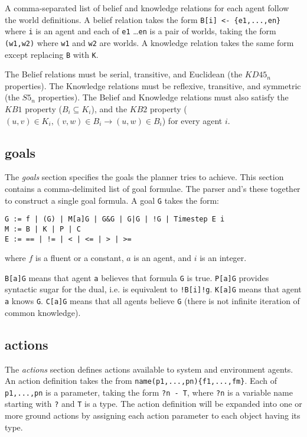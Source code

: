 \documentclass{article}
\newcommand{\kdff}{\ensuremath{KD45_n}}
\newcommand{\sfive}{\ensuremath{S5_n}}
\newcommand{\kbone}{\ensuremath{KB1}}
\newcommand{\kbtwo}{\ensuremath{KB2}}
\begin{document}
A comma-separated list of belief and knowledge relations for each agent follow the world definitions.
A belief relation takes the form
\verb|B[i] <- {e1,...,en}|
where \verb|i| is an agent
and each of \verb|e1| \ldots \verb|en| is a pair of worlds, taking the
form \verb|(w1,w2)| where \verb|w1| and \verb|w2| are worlds.
A knowledge relation takes the same form except replacing \verb|B| with \verb|K|.

The Belief relations must be serial, transitive, and Euclidean (the \kdff{}
properties). The Knowledge relations must be reflexive, transitive, and
symmetric (the \sfive{} properties). The Belief and Knowledge relations must also
satisfy the \kbone{} property ($B_i \subseteq K_i$), and the \kbtwo{} property
($(u,v) \in K_i, (v,w) \in B_i \rightarrow (u,w) \in B_i$) for every agent
$i$.



\subsection{goals}

The \emph{goals} section specifies the goals the planner tries to achieve.
This section contains a comma-delimited list of goal formulae. The parser and's
these together to construct a single goal formula. A goal \verb|G| takes the form:

\begin{lstlisting}
G := f | (G) | M[a]G | G&G | G|G | !G | Timestep E i
M := B | K | P | C
E := == | != | < | <= | > | >=
\end{lstlisting}

\noindent
where $f$ is a fluent or a constant, $a$ is an agent, 
and $i$ is an integer.

\verb|B[a]G| means that agent \verb|a| believes that formula \verb|G| is true.
\verb|P[a]G| provides syntactic sugar for the dual, i.e. is equivalent to
\verb|!B[i]!g|.
\verb|K[a]G| means that agent \verb|a| knows \verb|G|.
\verb|C[a]G| means that all agents believe \verb|G| 
(there is not infinite iteration of common knowledge).


\subsection{actions}

The \emph{actions} section defines actions available to system and environment
agents. An action definition takes the from 
\verb|name(p1,...,pn){f1,...,fm}|.
Each of \verb|p1,...,pn| is a parameter, taking the form \verb|?n - T|, where
\verb|?n| is a variable name starting with \verb|?| and \verb|T| is a type.
The action definition will be expanded into one or more ground actions by
assigning each action parameter to each object having its type.
\end{document}
